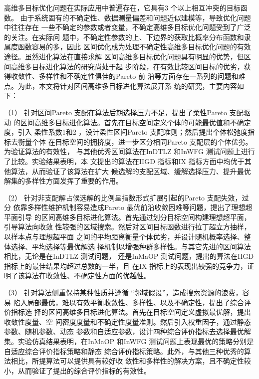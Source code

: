 \begin{cabstract}
高维多目标优化问题在实际应用中普遍存在，它具有3 个以上相互冲突的目标函数。
由于系统固有的不确定性、数据测量偏差和问题近似建模等，导致优化问题中往往存在
一些不确定的参数或者变量，不确定高维多目标优化问题受到了广泛的关注。在实际问
题中，不确定性参数的上、下边界的获取比概率分布函数和隶属度函数容易的多，因此
区间优化成为处理不确定性高维多目标优化问题的有效途径。虽然进化算法在直接求解
区间高维多目标优化问题具有明显的优势，但区间高维多目标进化算法的研究尚处于起
步阶段，在有效比较区间目标的优劣，获得收敛性、多样性和不确定性俱佳的Pareto 前
沿等方面存在一系列的问题和难点。为此，本文将针对区间高维多目标进化算法展开系
统的研究，主要内容如下：

（1） 针对区间Pareto 支配在算法后期选择压力不足，提出了柔性Pareto 支配驱动
的区间高维多目标进化算法。首先在目标空间定义个体的可能最优值和不确定度，引入
柔性系数1和2 ，设计柔性区间Pareto 支配准则；然后提出个体松弛度指标去衡量个体
在目标空间的拥挤度，进一步区分相同Pareto 支配层的个体优劣。为验证算法的有效性，
与其他优秀区间算法在InDTLZ 和InWFG 测试问题上进行了比较。实验结果表明，本
文提出的算法在IIGD 指标和IX 指标方面中均优于其他算法，从而验证了该算法在扩大
候选解的支配区域、缓解选择压力、提升最优解集的多样性方面发挥了重要的作用。

（2） 针对非支配解占候选解的比例呈指数形式扩展引起的Pareto 支配失效，过分
依靠多样性维护机制容易造成Pareto 最优前沿收敛困难等问题，提出了理想超平面引导
的区间高维多目标进化算法。首先通过划分目标空间构建理想超平面，引导算法向收敛
性较强的区域搜索。然后对区间目标函数进行拉丁超立方抽样，以样本点与理想超平面
之间的平均距离衡量个体优劣，并设计随机概率选择、整体选择、平均选择等最优解选
择机制以增强种群多样性。与其它先进的区间算法相比，无论是在InDTLZ 测试问题，
还是InMaOP 测试问题，提出的算法在IIGD 指标上的最佳结果均超过总数的一半，且
在IX 指标上的表现出较强的竞争力，证明了该算法在收敛性、不确定性方面的优越性。

（3） 针对算法侧重保持某种性质并遵循 “邻域假设”，造成搜索资源的浪费，容易
陷入局部最优，难以有效平衡收敛性、多样性、以及不确定性，提出了综合评价指标选
择的区间高维多目标进化算法。首先在目标空间定义虚拟最优解，提出收敛性度量、空
间密度度量和不确定性度量准则。然后引入权重因子，通过静态参数、随机参数、动态
参数和自适应参数，设计四种综合评价指标去选择最优解集。实验仿真结果表明，在InMaOP 和InWFG 测试问题上表现最优的策略分别是自适应综合评价指标策略和静态
综合评价指标策略。此外，与其他三种优秀的算法相比，所提算法可以提供具有较好收
敛性和多样性的解决方案，且不确定性较小，从而验证了提出的综合评价指标的有效性。


\end{cabstract}
